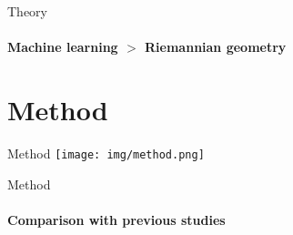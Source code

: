 \documentclass[xcolor={dvipsnames,table},12pt]{beamer}
\newif\ifplacelogo{}  %
\begin{document}
\begin{frame}{Theory}
    \framesubtitle{Machine learning $>$ Riemannian geometry}
    {
        \scriptsize
        
    }
\end{frame}

\section{Method}
\begin{frame}{Method}
    \texttt{[image: img/method.png]}
\end{frame}

\placelogofalse{}
\begin{frame}{Method}
    \framesubtitle{Comparison with previous studies}
    \vspace*{-10mm}
    \begin{adjustbox}{width=\textwidth,center,float=table}
        
    \end{adjustbox}
\end{frame}
\placelogotrue{}
\end{document}
